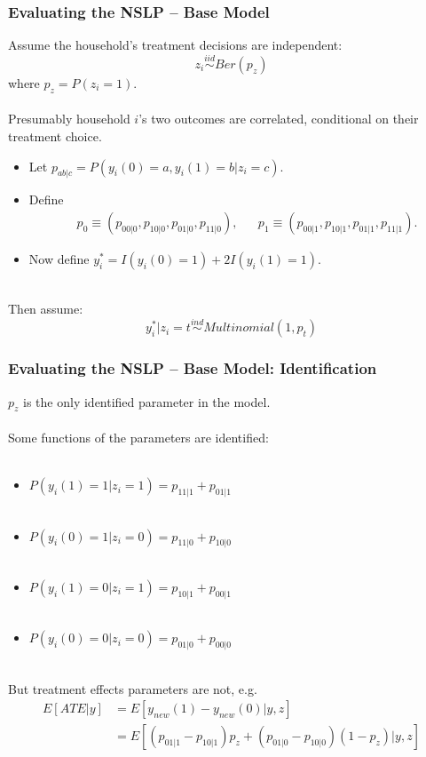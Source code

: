 \documentclass[xcolor=dvipsnames]{beamer}
\begin{document}
\begin{frame}
  \frametitle{Evaluating the NSLP -- Base Model}
Assume the household's treatment decisions are independent:
    \[
    z_i \stackrel{iid}{\sim}Ber(p_z)
    \]
    where $p_z=P(z_i=1)$.\\~\\
\pause Presumably household $i$'s two outcomes are correlated, conditional on their treatment choice. 
    \begin{itemize}
      \item Let $  p_{ab|c} = P(y_i(0)=a, y_i(1)=b|z_i=c)$.
      \item Define 
        \begin{align*}
          &p_0\equiv (p_{00|0}, p_{10|0}, p_{01|0}, p_{11|0}), &&p_1\equiv (p_{00|1}, p_{10|1}, p_{01|1}, p_{11|1}).
        \end{align*}
      \item Now define $y_i^*=I(y_i(0)=1) + 2I(y_i(1)=1)$. \\~
      \end{itemize}
\pause Then assume:
    \[
    y_i^*|z_i=t \stackrel{ind}{\sim}Multinomial(1,p_t)
    \]
\end{frame}

\begin{frame}
  \frametitle{Evaluating the NSLP -- Base Model: Identification}
$p_z$ is the only identified parameter in the model.\\~\\
 Some functions of the parameters are identified: \\~\\
    \begin{itemize}
      \item $P(y_i(1)=1|z_i=1) = p_{11|1} + p_{01|1}$\\~\\  
      \item $P(y_i(0)=1|z_i=0) =p_{11|0} + p_{10|0}$\\~\\
      \item $P(y_i(1)=0|z_i=1) =p_{10|1} + p_{00|1}$\\~\\ 
      \item $P(y_i(0)=0|z_i=0) =p_{01|0} + p_{00|0}$\\~\\
      \end{itemize}
But treatment effects parameters are not, e.g.
\begin{align*}
E[ATE|y] &= E[y_{new}(1) - y_{new}(0)|y,z] \\
&=E[(p_{01|1} - p_{10|1})p_z + (p_{01|0} - p_{10|0})(1-p_z)|y,z] 
\end{align*}
\end{frame}
\end{document}
